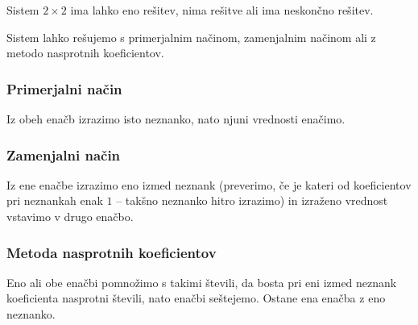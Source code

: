             
                    Sistem $2\times 2$ ima lahko eno rešitev, nima rešitve ali ima neskončno rešitev.
            

        

        
            
                Sistem lahko rešujemo s primerjalnim načinom, zamenjalnim načinom ali z metodo nasprotnih koeficientov.
            
        
            \subsubsection*{Primerjalni način}
                Iz obeh enačb izrazimo isto neznanko, nato njuni vrednosti enačimo.
            

            \subsubsection*{Zamenjalni način}
                Iz ene enačbe izrazimo eno izmed neznank (preverimo, če je kateri od koeficientov pri neznankah enak $1$ -- takšno neznanko hitro izrazimo) in izraženo vrednost vstavimo v drugo enačbo.
            

            \subsubsection*{Metoda nasprotnih koeficientov}
                Eno ali obe enačbi pomnožimo s takimi števili, da bosta pri eni izmed neznank koeficienta nasprotni števili, nato enačbi seštejemo.
                Ostane ena enačba z eno neznanko.
            

~~~
        


